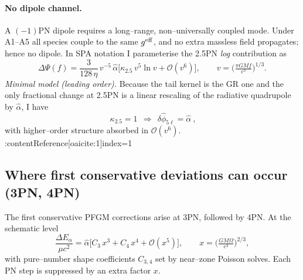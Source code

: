 \documentclass{iopjournal}
\begin{document}
\paragraph{No dipole channel.}
A $(-1)$PN dipole requires a long–range, non–universally coupled mode. Under A1--A5 all species couple to the same $g^{\rm eff}$, and no extra massless field propagates; hence no dipole. In SPA notation I parameterise the 2.5PN \emph{log} contribution as
\[
\Delta\Psi(f)=\frac{3}{128\,\eta}\,v^{-5}\,\widehat\alpha\Big[\kappa_{2.5}\,v^{5}\ln v+\mathcal O(v^{6})\Big],\qquad
v=\big(\tfrac{\pi GM f}{c^{3}}\big)^{1/3}.
\]
\emph{Minimal model (leading order).} Because the tail kernel is the GR one and the only fractional change at 2.5PN is a linear rescaling of the radiative quadrupole by $\widehat\alpha$, I have
\[
\boxed{\ \kappa_{2.5}=1\ \ \Rightarrow\ \ \delta\hat\phi_{5\ell}=\widehat\alpha\ } ,
\]
with higher–order structure absorbed in $\mathcal O(v^6)$. :contentReference[oaicite:1]{index=1}

\subsection{Where first conservative deviations can occur (3PN, 4PN)}\label{app:C5}

\begin{conceptbox}[Statement.]
	The first conservative PFGM corrections arise at 3PN, followed by 4PN. At the schematic level
\[
\frac{\Delta E_\alpha}{\mu c^{2}}=\widehat\alpha\Big[C_{3}\,x^{3}+C_{4}\,x^{4}+\mathcal O(x^{5})\Big],\qquad
x=\Big(\tfrac{GM\Omega}{c^{3}}\Big)^{2/3},
\]
with pure–number shape coefficients $C_{3,4}$ set by near–zone Poisson solves. Each PN step is suppressed by an extra factor $x$.
\end{conceptbox}
\end{document}
